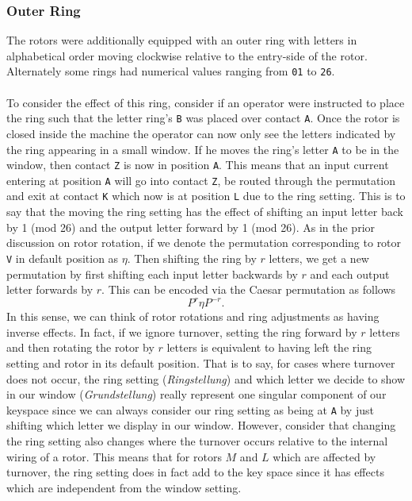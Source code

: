 \subsubsection{Outer Ring}

The rotors were additionally equipped with an outer ring with
letters in alphabetical order moving clockwise relative to the
entry-side of the rotor. Alternately some rings had numerical values
ranging from \texttt{01} to \texttt{26}.
\\\\To consider the effect of this ring,
consider if an operator were instructed to place the ring such that
the letter ring's \texttt{B} was placed over contact \texttt{A}. Once
the rotor is closed inside the machine
the operator can now only see the letters indicated by the ring
appearing in a small window. If he moves the ring's letter \texttt{A}
to be in the window, then contact \texttt{Z} is now in position
\texttt{A}. This means that an input current
entering at position \texttt{A} will go into contact \texttt{Z}, be
routed through the permutation and exit
at contact \texttt{K} which now is at position \texttt{L} due to the
ring setting. This is to say that the moving the ring
setting has the effect of shifting an input letter back by 1 (mod 26)
and the output letter forward by 1 (mod 26).
As in the prior discussion on rotor rotation, if we denote the
permutation corresponding to rotor \texttt{V} in default position as
$\eta$. Then shifting the ring by $r$ letters, we get a new
permutation by first shifting each input letter backwards by $r$ and
each output letter forwards by $r$. This can be encoded via the
Caesar permutation as follows
\[
  {P^{r}}\eta{P^{-r}}.
\]
In this sense, we can think of rotor rotations and ring adjustments
as having inverse effects. In fact, if we ignore turnover, setting
the ring forward by $r$ letters and then rotating the rotor by $r$
letters is equivalent to having left the ring setting and rotor in
its default position. That is to say, for cases where turnover does
not occur, the ring setting (\emph{Ringstellung}) and which letter
we decide to show in our window (\emph{Grundstellung}) really
represent one singular component of our keyspace since we can always
consider our ring setting as being at \texttt{A} by just shifting
which letter we display in our window.
However, consider that changing the ring
setting also changes where the turnover occurs relative to the
internal wiring of a rotor. This means that for rotors $M$ and $L$
which are affected by turnover, the ring setting does in fact add to
the key space since it has effects which are independent from the
window setting.

